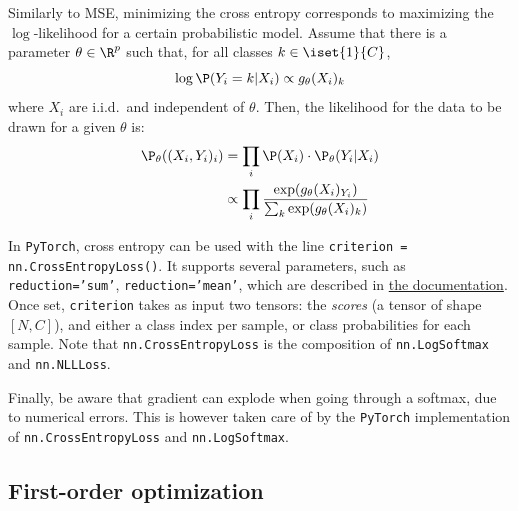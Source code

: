 Similarly to MSE, minimizing the cross entropy corresponds to maximizing the $\log$-likelihood for a certain probabilistic model. Assume that there is a parameter $\theta\in\R^p$ such that, for all classes $k\in\iset{1}{C}$,
\begin{equation*}
    \log\P(Y_i=k|X_i) \propto g_\theta(X_i)_k
\end{equation*}
where $X_i$ are i.i.d.~and independent of $\theta$. Then, the likelihood for the data to be drawn for a given $\theta$ is:
\begin{equation*}
    \begin{aligned}
        \P_\theta((X_i,Y_i)_i) &= \prod_i\P(X_i)\cdot\P_\theta(Y_i|X_i)\\
        &\propto\prod_i\frac{\exp(g_\theta(X_i)_{Y_i})}{\sum_k\exp(g_\theta(X_i)_k)}        
    \end{aligned}
\end{equation*}

In \texttt{PyTorch}, cross entropy can be used with the line \texttt{criterion = nn.CrossEntropyLoss()}. It supports several parameters, such as \texttt{reduction='sum'}, \texttt{reduction='mean'}, which are described in \href{https://pytorch.org/docs/stable/generated/torch.nn.MSELoss.html}{the documentation}. Once set, \texttt{criterion} takes as input two tensors: the \emph{scores} (a tensor of shape $[N,C]$), and either a class index per sample, or class probabilities for each sample. Note that \texttt{nn.CrossEntropyLoss} is the composition of \texttt{nn.LogSoftmax} and \texttt{nn.NLLLoss}.

Finally, be aware that gradient can explode when going through a softmax, due to numerical errors. This is however taken care of by the \texttt{PyTorch} implementation of \texttt{nn.CrossEntropyLoss} and \texttt{nn.LogSoftmax}.

\subsection{First-order optimization}
